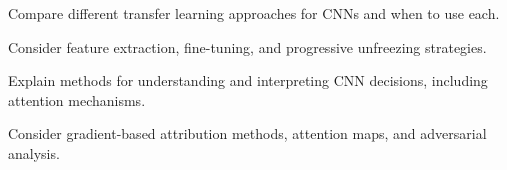 \begin{exercisebox}[hard]
\begin{problem}
Compare different transfer learning approaches for CNNs and when to use each.
\end{problem}
\begin{hintbox}
Consider feature extraction, fine-tuning, and progressive unfreezing strategies.
\end{hintbox}
\end{exercisebox}


\begin{exercisebox}[hard]
\begin{problem}
Explain methods for understanding and interpreting CNN decisions, including attention mechanisms.
\end{problem}
\begin{hintbox}
Consider gradient-based attribution methods, attention maps, and adversarial analysis.
\end{hintbox}
\end{exercisebox}


